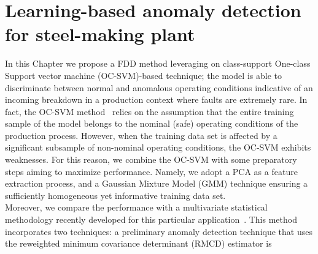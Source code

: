 \chapter{Learning-based anomaly detection for steel-making plant }
\label{Chapter:5}
In this Chapter we propose a FDD method leveraging on class-support One-class Support vector machine (OC-SVM)-based technique; the  model is able to discriminate between normal and anomalous operating conditions indicative of an incoming breakdown in a production context where faults are extremely rare. In fact, the OC-SVM method~\cite{scholkopf2001estimating, acernese2019_ECC} relies on the assumption that the entire training sample of the model belongs to the nominal (safe) operating conditions of the production process. However, when the training data set is affected by a significant subsample  of  non-nominal operating conditions, the OC-SVM exhibits weaknesses. For this reason, we combine the OC-SVM with some preparatory steps aiming to maximize performance. Namely, we adopt a PCA as a feature extraction process, and a Gaussian Mixture Model (GMM) technique  %
ensuring a  sufficiently homogeneous yet informative training data set.\\
\indent Moreover, we compare the performance with a multivariate statistical methodology recently developed for this particular application~\cite{sarda2021}. 
This method incorporates two techniques: %
a preliminary anomaly detection technique that uses the reweighted minimum covariance determinant (RMCD) estimator is

